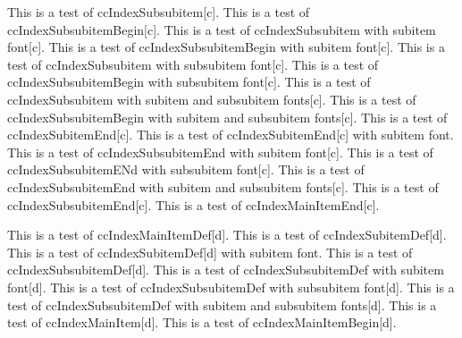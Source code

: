 \documentclass{article}
\begin{document}
{{{{This is a test of ccIndexSubsubitem[c].
This is a test of ccIndexSubsubitemBegin[c].
This is a test of ccIndexSubsubitem with subitem font[c].
This is a test of ccIndexSubsubitemBegin with subitem font[c].
This is a test of ccIndexSubsubitem with subsubitem font[c].
This is a test of ccIndexSubsubitemBegin with subsubitem font[c].
This is a test of ccIndexSubsubitem with subitem and subsubitem fonts[c].
This is a test of ccIndexSubsubitemBegin with subitem and subsubitem fonts[c].
\pagebreak
This is a test of ccIndexSubitemEnd[c].
This is a test of ccIndexSubitemEnd[c] with subitem font.
This is a test of ccIndexSubsubitemEnd with subitem font[c].
This is a test of ccIndexSubsubitemENd with subsubitem font[c].
This is a test of ccIndexSubsubitemEnd with subitem and subsubitem fonts[c].
This is a test of ccIndexSubsubitemEnd[c].
This is a test of ccIndexMainItemEnd[c].

This is a test of ccIndexMainItemDef[d].
This is a test of ccIndexSubitemDef[d].
This is a test of ccIndexSubitemDef[d] with subitem font.
This is a test of ccIndexSubsubitemDef[d].
This is a test of ccIndexSubsubitemDef with subitem font[d].
This is a test of ccIndexSubsubitemDef with subsubitem font[d].
This is a test of ccIndexSubsubitemDef with subitem and subsubitem fonts[d].
\pagebreak
This is a test of ccIndexMainItem[d].
This is a test of ccIndexMainItemBegin[d].

}}}}
\end{document}
